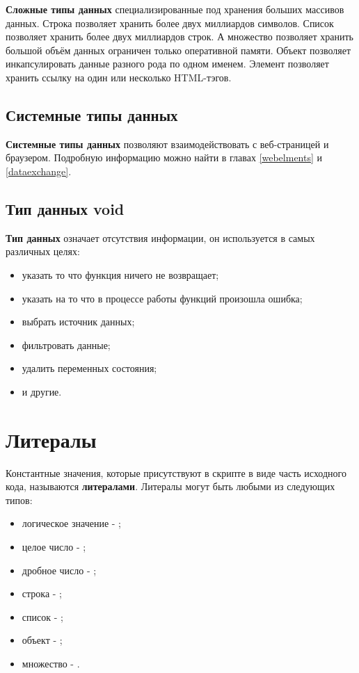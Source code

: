 \documentclass[a4paper, 14pt]{extarticle}
\newenvironment{icItems}
	{ \begin{itemize} [noitemsep,nolistsep] }
	{ \end{itemize} }
\begin{document}
	{\bf Сложные типы данных} специализированные под хранения больших массивов данных. Строка позволяет хранить более двух миллиардов символов. Список позволяет хранить более двух миллиардов строк. А множество позволяет хранить большой объём данных ограничен только оперативной памяти. Объект позволяет инкапсулировать данные разного рода по одном именем. Элемент позволяет хранить ссылку на один или несколько HTML-тэгов.

\subsection{Системные типы данных}

	{\bf Системные типы данных} позволяют взаимодействовать с веб-страницей и браузером. Подробную информацию можно найти в главах \ref{webelments} и \ref{dataexchange}.
	
\subsection{Тип данных {\color{bluemarin} void}}

	{\bf Тип данных } означает отсутствия информации, он используется в самых различных целях:
\begin{icItems}
	\item указать то что функция ничего не возвращает;
	\item указать на то что в процессе работы функций произошла ошибка;
	\item выбрать источник данных;
	\item фильтровать данные;
	\item удалить переменных состояния;
	\item и другие.
\end{icItems}

\newpage
\section{Литералы}
	
	Константные значения, которые присутствуют в скрипте в виде часть исходного кода, называются {\bf литералами}.
	Литералы могут быть любыми из следующих типов:
\begin{icItems}
	\item логическое значение - ;
	\item целое число - ;
	\item дробное число - ;
	\item строка - ;
	\item список - ;
	\item объект - ;
	\item множество - .
\end{icItems}
\end{document}
